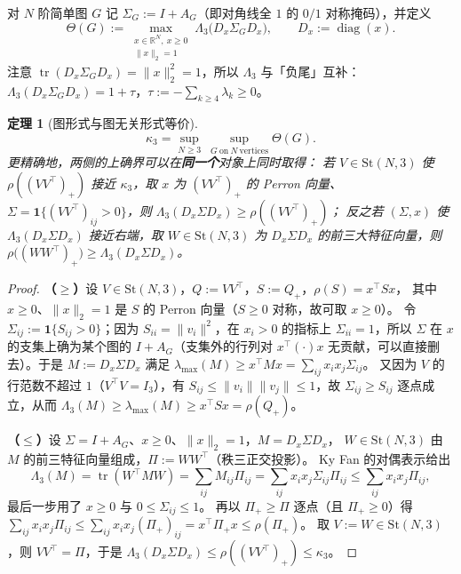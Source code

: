 \documentclass[UTF8,11pt]{ctexart}
\newtheorem{theorem}{定理}[section]
\theoremstyle{definition}
\newcommand{\Lam}{\Lambda}
\newcommand{\tr}{\operatorname{tr}}
\newcommand{\R}{\mathbb{R}}
\begin{document}
对 $N$ 阶简单图 $G$ 记 $\Sigma_G:=I+A_G$（即对角线全 $1$ 的 $0/1$ 对称掩码），并定义
\begin{equation}\label{eq:thetaG}
\Theta(G):=\max_{\substack{x\in\R^N,\ x\ge0\\ \|x\|_2=1}}\Lam_3\bigl(D_x\Sigma_GD_x\bigr),
\qquad D_x:=\operatorname{diag}(x).
\end{equation}
注意 $\tr(D_x\Sigma_GD_x)=\|x\|_2^2=1$，所以 $\Lam_3$ 与「负尾」互补：
$\Lam_3(D_x\Sigma_GD_x)=1+\tau$，$\tau:=-\sum_{k\ge4}\lambda_k\ge0$。

\begin{theorem}[图形式与图无关形式等价]\label{thm:r20equiv}
\begin{equation}\label{eq:r20equiv}
\kappa_3=\sup_{N\ge3}\ \sup_{G\ \text{on}\ N\ \text{vertices}}\Theta(G).
\end{equation}
更精确地，两侧的上确界可以在\textbf{同一个}对象上同时取得：
若 $V\in\mathrm{St}(N,3)$ 使 $\rho((VV^\top)_+)$ 接近 $\kappa_3$，取 $x$ 为 $(VV^\top)_+$ 的
Perron 向量、$\Sigma=\mathbf 1\{(VV^\top)_{ij}>0\}$，则 $\Lam_3(D_x\Sigma D_x)\ge\rho((VV^\top)_+)$；
反之若 $(\Sigma,x)$ 使 $\Lam_3(D_x\Sigma D_x)$ 接近右端，取 $W\in\mathrm{St}(N,3)$ 为
$D_x\Sigma D_x$ 的前三大特征向量，则 $\rho\bigl((WW^\top)_+\bigr)\ge\Lam_3(D_x\Sigma D_x)$。
\end{theorem}

\begin{proof}
\textbf{（$\ge$）}设 $V\in\mathrm{St}(N,3)$，$Q:=VV^\top$，$S:=Q_+$，$\rho(S)=x^\top Sx$，
其中 $x\ge0$、$\|x\|_2=1$ 是 $S$ 的 Perron 向量（$S\ge0$ 对称，故可取 $x\ge0$）。
令 $\Sigma_{ij}:=\mathbf 1\{S_{ij}>0\}$；因为 $S_{ii}=\|v_i\|^2$，在 $x_i>0$ 的指标上
$\Sigma_{ii}=1$，所以 $\Sigma$ 在 $x$ 的支集上确为某个图的 $I+A_G$（支集外的行列对
$x^\top(\cdot)x$ 无贡献，可以直接删去）。于是 $M:=D_x\Sigma D_x$ 满足
$\lambda_{\max}(M)\ge x^\top Mx=\sum_{ij}x_ix_j\Sigma_{ij}$。
又因为 $V$ 的行范数不超过 $1$（$V^\top V=I_3$），有 $S_{ij}\le\|v_i\|\|v_j\|\le1$，故
$\Sigma_{ij}\ge S_{ij}$ 逐点成立，从而
$\Lam_3(M)\ge\lambda_{\max}(M)\ge x^\top Sx=\rho(Q_+)$。

\textbf{（$\le$）}设 $\Sigma=I+A_G$、$x\ge0$、$\|x\|_2=1$，$M=D_x\Sigma D_x$，
$W\in\mathrm{St}(N,3)$ 由 $M$ 的前三特征向量组成，$\Pi:=WW^\top$（秩三正交投影）。
Ky Fan 的对偶表示给出
\begin{equation}\label{eq:r20kyfan}
\Lam_3(M)=\tr(W^\top MW)=\sum_{ij}M_{ij}\Pi_{ij}
=\sum_{ij}x_ix_j\Sigma_{ij}\Pi_{ij}\le\sum_{ij}x_ix_j\Pi_{ij},
\end{equation}
最后一步用了 $x\ge0$ 与 $0\le\Sigma_{ij}\le1$。
再以 $\Pi_+\ge\Pi$ 逐点（且 $\Pi_+\ge0$）得
$\sum_{ij}x_ix_j\Pi_{ij}\le\sum_{ij}x_ix_j(\Pi_+)_{ij}=x^\top\Pi_+x\le\rho(\Pi_+)$。
取 $V:=W\in\mathrm{St}(N,3)$，则 $VV^\top=\Pi$，于是
$\Lam_3(D_x\Sigma D_x)\le\rho((VV^\top)_+)\le\kappa_3$。
\end{proof}
\end{document}
